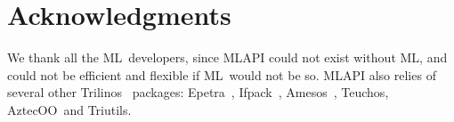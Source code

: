 \documentclass{article}[11pt]
\newcommand{\Aztecoo}  {{\sc AztecOO}}
\newcommand{\aztecoo}  {{\Aztecoo}}
\newcommand{\epetra}  {{\sc Epetra}}
\newcommand{\ML}     {{\sc ML}}
\newcommand{\trilinos}  {{\sc Trilinos}}
\newcommand{\amesos}  {{\sc Amesos}}
\newcommand{\triutils}  {{\sc Triutils}}
\newcommand{\ifpack}  {{\sc Ifpack}}
\newcommand{\teuchos}  {{\sc Teuchos}}
\newcommand{\MLAPI}  {{\sc MLAPI }}
\begin{document}
\section*{Acknowledgments}
\label{sec:acks}

We thank all the \ML\ developers, since \MLAPI could not exist without \ML, and
could not be efficient and flexible if \ML\ would not be so. \MLAPI also
relies of several other \trilinos~\cite{Trilinos-home-page} packages:
\epetra~\cite{epetra-guide}, \ifpack~\cite{ifpack-guide},
  \amesos~\cite{amesos-guide}, \teuchos, \aztecoo\ and \triutils. 


\end{document}
